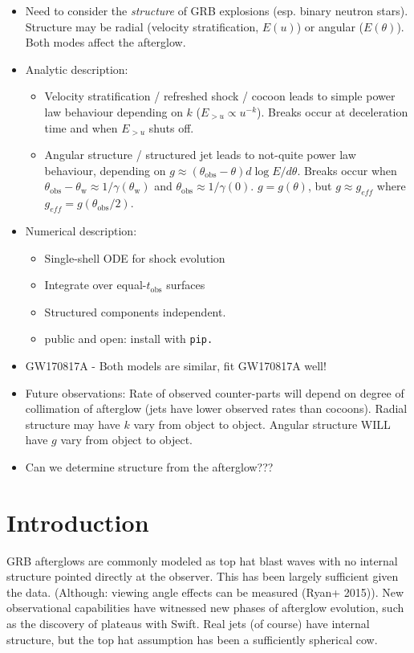 \documentclass[twocolumn]{aastex62}
\newcommand{\tobs}{\ensuremath{t_{\mathrm{obs}}}}
\newcommand{\thobs}{\ensuremath{\theta_{\mathrm{obs}}}}
\newcommand{\thW}{\ensuremath{\theta_{\mathrm{w}}}}
\begin{document}
\begin{itemize}
	\item Need to consider the \emph{structure} of GRB explosions (esp. binary neutron stars).  Structure may be radial (velocity stratification, $E(u)$) or angular ($E(\theta)$).  Both modes affect the afterglow.
	\item Analytic description: \begin{itemize}
		\item Velocity stratification / refreshed shock / cocoon leads to simple power law behaviour depending on $k$ ($E_{>u} \propto u^{-k}$).  Breaks occur at deceleration time and when $E_{>u}$ shuts off.
		\item Angular structure / structured jet leads to not-quite power law behaviour, depending on $g \approx (\thobs - \theta)d \log E / d\theta$.  Breaks occur when $\thobs - \thW \approx 1/\gamma(\thW)$ and $\thobs \approx 1/\gamma(0)$.  $g = g(\theta)$, but $g\approx g_{eff}$ where $g_{eff} = g(\thobs/2)$.
		\end{itemize}
	\item Numerical description: \begin{itemize}
		\item Single-shell ODE for shock evolution
		\item Integrate over equal-$\tobs$ surfaces
		\item Structured components independent.
		\item public and open: install with \tt{pip}.
		\end{itemize}
	\item GW170817A - Both models are similar, fit GW170817A well!
	\item Future observations: Rate of observed counter-parts will depend on degree of collimation of afterglow (jets have lower observed rates than cocoons).  Radial structure may have $k$ vary from object to object.  Angular structure WILL have $g$ vary from object to object.
	\item Can we determine structure from the afterglow???
\end{itemize}

\section{Introduction}

GRB afterglows are commonly modeled as top hat blast waves with no internal structure pointed directly at the observer.  This has been largely sufficient given the data.  (Although: viewing angle effects can be measured (Ryan+ 2015)).  New observational capabilities have witnessed new phases of afterglow evolution, such as the discovery of plateaus with Swift.  Real jets (of course) have internal structure, but the top hat assumption has been a sufficiently spherical cow. 
\end{document}
